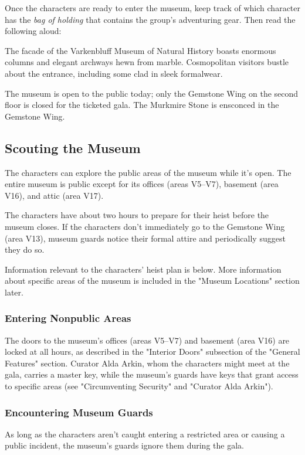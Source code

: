\documentclass[10pt,a4paper,twoside,bg=print,twocolumn,openany,nodeprecatedcode]{dndbook}
\begin{document}
Once the characters are ready to enter the museum, keep track of which character has the \textit{bag of holding} that contains the group's adventuring gear. Then read the following aloud:

\begin{DndReadAloud}{}
The facade of the Varkenbluff Museum of Natural History boasts enormous columns and elegant archways hewn from marble. Cosmopolitan visitors bustle about the entrance, including some clad in sleek formalwear.

\end{DndReadAloud}

The museum is open to the public today; only the Gemstone Wing on the second floor is closed for the ticketed gala. The Murkmire Stone is ensconced in the Gemstone Wing.

\subsection{Scouting the Museum}
The characters can explore the public areas of the museum while it's open. The entire museum is public except for its offices (areas V5–V7), basement (area V16), and attic (area V17).

The characters have about two hours to prepare for their heist before the museum closes. If the characters don't immediately go to the Gemstone Wing (area V13), museum guards notice their formal attire and periodically suggest they do so.

Information relevant to the characters' heist plan is below. More information about specific areas of the museum is included in the "Museum Locations" section later.

\subsubsection{Entering Nonpublic Areas}
The doors to the museum's offices (areas V5–V7) and basement (area V16) are locked at all hours, as described in the "Interior Doors" subsection of the "General Features" section. Curator Alda Arkin, whom the characters might meet at the gala, carries a master key, while the museum's guards have keys that grant access to specific areas (see "Circumventing Security" and "Curator Alda Arkin").

\subsubsection{Encountering Museum Guards}
As long as the characters aren't caught entering a restricted area or causing a public incident, the museum's guards ignore them during the gala.
\end{document}
